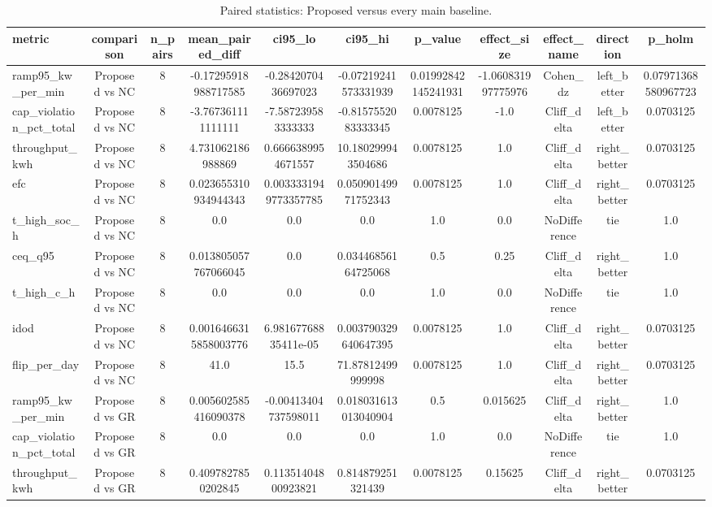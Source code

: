 \begin{table}[t]
\centering
\caption{Paired statistics: Proposed versus every main baseline.}
\label{tab:stats_all_auto}
\begin{tabular}{lcccccccccc}
\toprule
metric & comparison & n\_pairs & mean\_paired\_diff & ci95\_lo & ci95\_hi & p\_value & effect\_size & effect\_name & direction & p\_holm \\
\midrule
ramp95\_kw\_per\_min & Proposed vs NC & 8 & -0.17295918988717585 & -0.2842070436697023 & -0.07219241573331939 & 0.01992842145241931 & -1.060831997775976 & Cohen\_dz & left\_better & 0.07971368580967723 \\
cap\_violation\_pct\_total & Proposed vs NC & 8 & -3.767361111111111 & -7.587239583333333 & -0.8157552083333345 & 0.0078125 & -1.0 & Cliff\_delta & left\_better & 0.0703125 \\
throughput\_kwh & Proposed vs NC & 8 & 4.731062186988869 & 0.6666389954671557 & 10.180299943504686 & 0.0078125 & 1.0 & Cliff\_delta & right\_better & 0.0703125 \\
efc & Proposed vs NC & 8 & 0.023655310934944343 & 0.0033331949773357785 & 0.05090149971752343 & 0.0078125 & 1.0 & Cliff\_delta & right\_better & 0.0703125 \\
t\_high\_soc\_h & Proposed vs NC & 8 & 0.0 & 0.0 & 0.0 & 1.0 & 0.0 & NoDifference & tie & 1.0 \\
ceq\_q95 & Proposed vs NC & 8 & 0.013805057767066045 & 0.0 & 0.03446856164725068 & 0.5 & 0.25 & Cliff\_delta & right\_better & 1.0 \\
t\_high\_c\_h & Proposed vs NC & 8 & 0.0 & 0.0 & 0.0 & 1.0 & 0.0 & NoDifference & tie & 1.0 \\
idod & Proposed vs NC & 8 & 0.0016466315858003776 & 6.98167768835411e-05 & 0.003790329640647395 & 0.0078125 & 1.0 & Cliff\_delta & right\_better & 0.0703125 \\
flip\_per\_day & Proposed vs NC & 8 & 41.0 & 15.5 & 71.87812499999998 & 0.0078125 & 1.0 & Cliff\_delta & right\_better & 0.0703125 \\
ramp95\_kw\_per\_min & Proposed vs GR & 8 & 0.005602585416090378 & -0.00413404737598011 & 0.018031613013040904 & 0.5 & 0.015625 & Cliff\_delta & right\_better & 1.0 \\
cap\_violation\_pct\_total & Proposed vs GR & 8 & 0.0 & 0.0 & 0.0 & 1.0 & 0.0 & NoDifference & tie & 1.0 \\
throughput\_kwh & Proposed vs GR & 8 & 0.4097827850202845 & 0.11351404800923821 & 0.814879251321439 & 0.0078125 & 0.15625 & Cliff\_delta & right\_better & 0.0703125 \\

\end{tabular}
\end{table}
